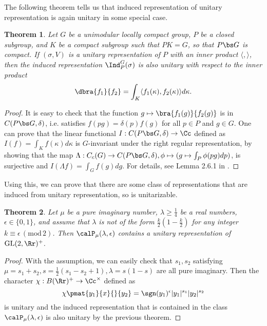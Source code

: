 \documentclass{article}
\newtheorem{theorem}{Theorem}[section]
\newcommand{\GL}{\mathrm{GL}}
\newcommand{\Mod}[1]{\,(\mathrm{mod}\,#1)}
\begin{document}
The following theorem tells us that induced representation of unitary representation is again unitary in some special case. 
\begin{theorem}
Let $G$ be a unimodular locally compact group, $P$ be a closed subgroup, and $K$ be a compact subgroup such that $PK = G$, so that $P\bs G$ is compact. If $(\sigma, V)$ is a unitary representation of $P$ with an inner product $\langle, \rangle$, then the induced representation $\Ind_{P}^{G}(\sigma)$ is also unitary with respect to the inner product 
$$
\dbra{f_{1}}{f_{2}} = \int_{K} \langle f_{1}(\kappa), f_{2}(\kappa)\rangle d\kappa. 
$$ 
\end{theorem}
\begin{proof}
It is easy to check that the function $g\mapsto \bra{f_{1}(g)}{f_{2}(g)}$ is in $C(P\bs G, \delta)$, i.e. satisfies $f(pg) =\delta(p)f(g)$ for all $p\in P$ and $g\in G$. 
One can prove that the linear functional $I:C(P\bs G, \delta)\to \Cc$ defined as $I(f) = \int_{K} f(\kappa)d\kappa$ is $G$-invariant under the right regular representation, by showing that the map $\Lambda:C_{c}(G)\to C(P\bs G, \delta), \phi\mapsto (g\mapsto \int_{P} \phi(pg)dp)$, is surjective and $I(\Lambda f) = \int_{G}f(g)dg$. 
For details, see Lemma 2.6.1 in \cite{bu}. 
\end{proof}
Using this, we can prove that there are some class of representations that are induced from unitary representation, so is unitarizable. 
\begin{theorem}
Let $\mu$ be a pure imaginary number, $\lambda\geq \frac{1}{4}$  be a real numbers, $\epsilon\in \{0, 1\}$, and assume that $\lambda$ is not of the form $\frac{k}{2}\left(1-\frac{k}{2}\right)$ for any integer $k\equiv \epsilon\Mod{2}$. Then $\calP_{\mu}(\lambda, \epsilon)$ contains a unitary representation of $\GL(2, \Rr)^{+}$. 
\end{theorem}
\begin{proof}
With the assumption, we can easily check that $s_{1}, s_{2}$ satisfying $\mu = s_{1} + s_{2}, s = \frac{1}{2}(s_{1}-  s_{2} + 1), \lambda = s(1-s)$ are all pure imaginary. Then the character $\chi:B(\Rr)^{+}\to \Cc^{\times}$ defined as
$$
\chi\pmat{y_{1}}{x}{}{y_{2}} = \sgn(y_{1})^{\epsilon}|y_{1}|^{s_{1}}|y_{2}|^{s_{2}}
$$
is unitary and the induced representation that is contained in the class $\calP_{\mu}(\lambda, \epsilon)$ is also unitary by the previous theorem. 
\end{proof}
\end{document}
